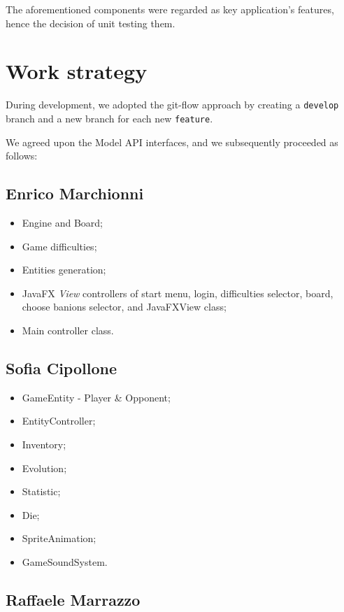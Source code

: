 \documentclass[12pt, a4paper]{report}
\theoremstyle{definition}
\begin{document}
    The aforementioned components were regarded as key application's features, hence the decision of unit testing them.

\section{Work strategy}

    During development, we adopted the git-flow approach by creating a \verb|develop| branch and a new branch for each new \verb|feature|.

    We agreed upon the Model API interfaces, and we subsequently proceeded as follows:

    \subsection*{Enrico Marchionni}

    \begin{itemize}
        \item Engine and Board;
        \item Game difficulties;
        \item Entities generation;
        \item JavaFX \emph{View} controllers of start menu, login, difficulties selector, board, choose banions selector, and JavaFXView class;
        \item Main controller class.
    \end{itemize}

    \subsection*{Sofia Cipollone}

    \begin{itemize}
        \item GameEntity - Player \& Opponent;
        \item EntityController;
        \item Inventory;
        \item Evolution;
        \item Statistic;
        \item Die;
        \item SpriteAnimation;
        \item GameSoundSystem.
    \end{itemize}

    \subsection*{Raffaele Marrazzo}
\end{document}
